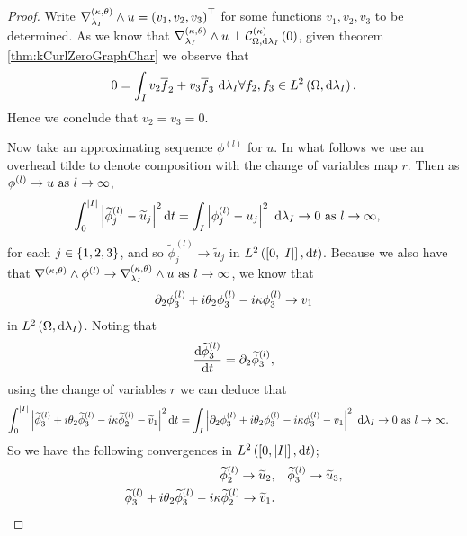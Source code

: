 \begin{proof}
	Write $\nabla_{\lambda_I}^{\left( \kappa, \theta \right)}\wedge u = \left( v_1, v_2, v_3 \right)^{\top}$ for some functions $v_1,v_2,v_3$ to be determined.
	As we know that $\nabla_{\lambda_I}^{\left( \kappa, \theta \right)}\wedge u \perp \mathcal{C}_{ \Omega, \mathrm{d}\lambda_I}^{(\kappa)}\left( 0 \right)$, given theorem \ref{thm:kCurlZeroGraphChar} we observe that
	\begin{align*}
		0 = \int_{I}v_2\overline{f}_2 + v_3\overline{f}_3 \ \mathrm{d}\lambda_I \forall f_2,f_3\in L^{2}\left( \Omega,\mathrm{d}\lambda_I \right).
	\end{align*}
	Hence we conclude that $v_2=v_3=0$. \newline
	
	Now take an approximating sequence $\phi^{(l)}$ for $u$.
	In what follows we use an overhead tilde to denote composition with the change of variables map $r$.
	Then as $\phi^{(l)}\rightarrow u \ \text{as} \ l \rightarrow\infty$,
	\begin{align*}
		\int_0^{\left\lvert I \right\rvert}\left\lvert \widetilde{\phi}^{(l)}_j - \widetilde{u}_j \right\rvert^2 \mathrm{d} t
		&= \int_{I}\left\lvert \phi^{(l)}_j - u_j \right\rvert^2 \ \mathrm{d}\lambda_I
		\rightarrow 0 \ \text{as} \ l \rightarrow\infty,
	\end{align*}
	for each $j\in\left\{ 1,2,3 \right\}$, and so $\widetilde{\phi}^{(l)}_j\rightarrow\widetilde{u}_j$ in $L^{2}\left( \left[ 0,\left\lvert I \right\rvert \right],\mathrm{d}t \right)$.
	Because we also have that $\nabla_{}^{\left( \kappa, \theta \right)}\wedge\phi^{(l)}\rightarrow \nabla_{\lambda_I}^{\left( \kappa, \theta \right)}\wedge u \ \text{as} \ l \rightarrow\infty$, we know that
	\begin{align*}
		\partial_2\phi^{(l)}_3 + i\theta_2\phi^{(l)}_3 - i\kappa\phi^{(l)}_3 \rightarrow v_1
	\end{align*}
	in $L^{2}\left( \Omega,\mathrm{d}\lambda_I \right)$.
	Noting that 
	\begin{align*}
		\dfrac{\mathrm{d}\widetilde{\phi}^{(l)}_3}{\mathrm{d}t} = \partial_2\widetilde{\phi}^{(l)}_3,
	\end{align*}
	using the change of variables $r$ we can deduce that
	\begin{align*}
		\int_0^{\left\lvert I \right\rvert}\left\lvert \widetilde{\phi}^{(l)}_3 + i\theta_2\widetilde{\phi}^{(l)}_3 - i\kappa\widetilde{\phi}^{(l)}_2 - \widetilde{v}_1 \right\rvert^2 \mathrm{d} t
		&= \int_{I}\left\lvert \partial_2\phi^{(l)}_3 + i\theta_2\phi^{(l)}_3 - i\kappa\phi^{(l)}_3 - v_1 \right\rvert^2 \ \mathrm{d}\lambda_I
		\rightarrow 0 \ \text{as} \ l \rightarrow\infty.
	\end{align*}
	So we have the following convergences in $L^{2}\left( \left[ 0,\left\lvert I \right\rvert \right],\mathrm{d}t \right)$;
	\begin{align*}
		\widetilde{\phi}^{(l)}_2 \rightarrow \widetilde{u}_2,
		&\quad \widetilde{\phi}^{(l)}_3 \rightarrow \widetilde{u}_3, \\
		\widetilde{\phi}^{(l)}_3 + i\qm_2\widetilde{\phi}^{(l)}_3 - i\wavenumber\widetilde{\phi}^{(l)}_2 \rightarrow \widetilde{v}_1. &

\end{align*}
\end{proof}
